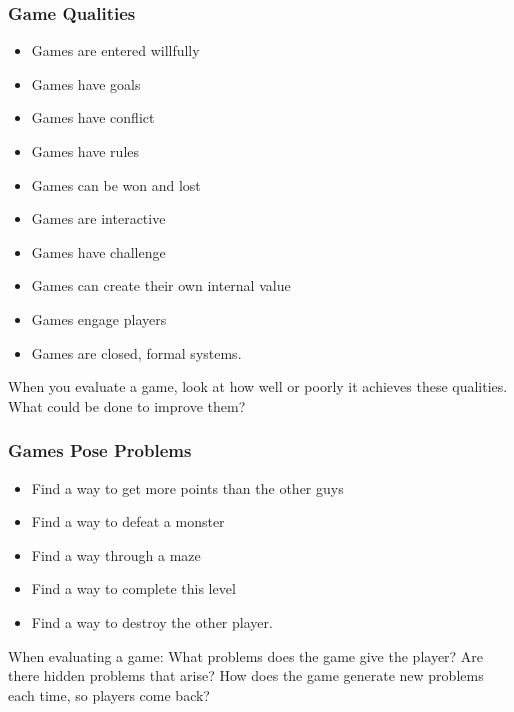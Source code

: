 \documentclass{beamer}
\begin{document}
\begin{frame}
  \frametitle{Game Qualities}

\begin{itemize}
  \item Games are entered willfully
\item Games have goals
\item Games have conflict
\item Games have rules
\item Games can be won and lost
\item Games are interactive
\item Games have challenge
\item Games can create their own internal value
\item Games engage players
\item Games are closed, formal systems.

\end{itemize}

When you evaluate a game, look at how well or poorly it achieves these
qualities.  What could be done to improve them?

\end{frame}

\begin{frame}
  \frametitle{Games Pose Problems}

\begin{itemize}
  \item Find a way to get more points than the other guys
\item Find a way to defeat a monster
\item Find a way through a maze
\item Find a way to complete this level
\item Find a way to destroy the other player.
\end{itemize}

When evaluating a game:  What problems does the game give the player?
Are there hidden problems that arise?  How does the game generate new
problems each time, so players come back?

\end{frame}
\end{document}
